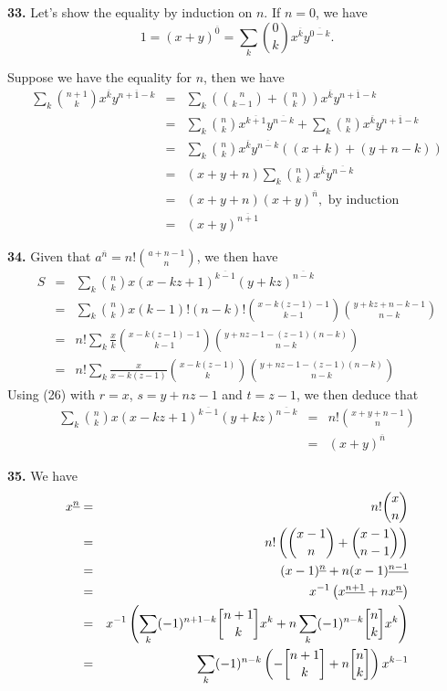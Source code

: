 \documentclass[a4paper,12pt]{article}
\newcommand{\newpar}[1]{\bigskip \noindent \textbf{#1.}}
\newcommand{\stirlingone}[2]{{#1 \atopwithdelims[]#2}}
\begin{document}
\newpar{33} Let's show the equality by induction on $n$.  If $n=0$, we
have
\[ 1 = (x + y)^{\overline{0}} = \sum_k {0 \choose k} x^{\overline{k}}
y^{\overline{0-k}}.\]

Suppose we have the equality for $n$, then we have
\begin{eqnarray*}
  \sum_k {n+1 \choose k} x^{\overline{k}} y^{\overline{n+1-k}} &=&
  \sum_k \left( {n \choose k-1} + {n \choose k} \right)
  x^{\overline{k}} y^{\overline{n+1-k}} \\
  &=& \sum_k {n \choose k} x^{\overline{k+1}} y^{\overline{n-k}} +
  \sum_k {n \choose k} x^{\overline{k}} y^{\overline{n+1-k}} \\
  &=& \sum_k {n \choose k} x^{\overline{k}} y^{\overline{n-k}} ((x + k
  )+ (y + n - k)) \\
  &=& (x + y + n) \sum_k {n \choose k} x^{\overline{k}}
  y^{\overline{n-k}}\\
  &=& (x + y + n) (x+y)^{\overline{n}}, \mbox{ by induction} \\
  &=& (x + y)^{\overline{n+1}}
\end{eqnarray*}

\newpar{34}  Given that $a^{\overline{n}} = n!{a+n-1 \choose n}$, we
then have
\begin{eqnarray*}
  S &=& \sum_k {n \choose k}
  x(x-kz+1)^{\overline{k-1}}(y+kz)^{\overline{n-k}} \\ &=& \sum_k {n
    \choose k} x (k-1)!(n-k)! {x-k(z-1)-1 \choose k-1} {y + kz + n - k
    - 1 \choose n-k} \\
  &=& n!\sum_k \frac{x}{k} {x -k (z-1)-1 \choose k-1}{y+nz - 1 -
    (z-1)(n-k) \choose n-k} \\
  &=& n! \sum_k \frac{x}{x - k(z-1)} {x - k(z-1) \choose k}{y+nz-1 -
    (z-1)(n-k) \choose n-k}
\end{eqnarray*}
Using (26) with $r=x$, $s = y+nz-1$ and $t = z-1$, we then deduce that
\begin{eqnarray*}
  \sum_k {n\choose k}x(x-kz+1)^{\overline{k-1}}(y+kz)^{\overline{n-k}}
  &=& n! {x + y + n - 1 \choose n} \\
  &=& (x+y)^{\overline{n}}
\end{eqnarray*}

\newpar{35} We have
\begin{eqnarray*}
  x^{\underline{n}} &=& n! {x \choose n} \\
  &=& n! \left( {x-1 \choose n} + {x-1 \choose n-1} \right) \\
  &=& (x-1)^{\underline{n}} + n (x-1)^{\underline{n-1}} \\
  &=& x^{-1} \left( x^{\underline{n+1}} + n x^{\underline{n}}\right)\\
  &=& x^{-1} \left( \sum_k (-1)^{n+1-k} \stirlingone{n+1}{k} x^k + n
  \sum_k (-1)^{n-k}\stirlingone{n}{k}x^k\right) \\
  &=& \sum_k (-1)^{n-k} \left( -\stirlingone{n+1}{k} + n
  \stirlingone{n}{k}\right) x^{k-1}
\end{eqnarray*}
\end{document}
